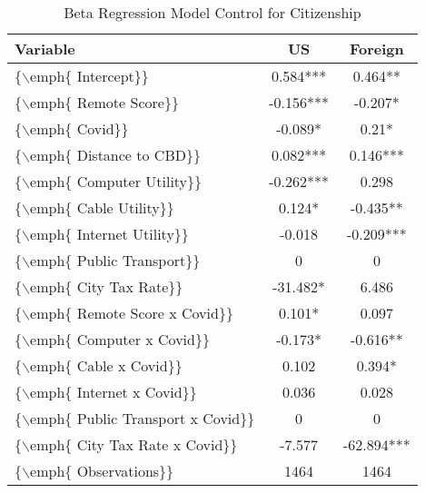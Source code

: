 \begin{table}[ht]
\centering
\begin{tabular}{|l|c|c|}
  \hline
Variable & US & Foreign \\ 
  \hline
\{$\backslash$emph\{ Intercept\}\} & 0.584*** & 0.464** \\ 
  \{$\backslash$emph\{ Remote Score\}\} & -0.156*** & -0.207* \\ 
  \{$\backslash$emph\{ Covid\}\} & -0.089* & 0.21* \\ 
  \{$\backslash$emph\{ Distance to CBD\}\} & 0.082*** & 0.146*** \\ 
  \{$\backslash$emph\{ Computer Utility\}\} & -0.262*** & 0.298 \\ 
  \{$\backslash$emph\{ Cable Utility\}\} & 0.124* & -0.435** \\ 
  \{$\backslash$emph\{ Internet Utility\}\} & -0.018 & -0.209*** \\ 
  \{$\backslash$emph\{ Public Transport\}\} & 0 & 0 \\ 
  \{$\backslash$emph\{ City Tax Rate\}\} & -31.482* & 6.486 \\ 
  \{$\backslash$emph\{ Remote Score x Covid\}\} & 0.101* & 0.097 \\ 
  \{$\backslash$emph\{ Computer x Covid\}\} & -0.173* & -0.616** \\ 
  \{$\backslash$emph\{ Cable x Covid\}\} & 0.102 & 0.394* \\ 
  \{$\backslash$emph\{ Internet x Covid\}\} & 0.036 & 0.028 \\ 
  \{$\backslash$emph\{ Public Transport x Covid\}\} & 0 & 0 \\ 
  \{$\backslash$emph\{ City Tax Rate x Covid\}\} & -7.577 & -62.894*** \\ 
  \{$\backslash$emph\{ Observations\}\} & 1464 & 1464 \\ 
   \hline
\end{tabular}
\caption{Beta Regression Model Control for Citizenship} 
\end{table}
